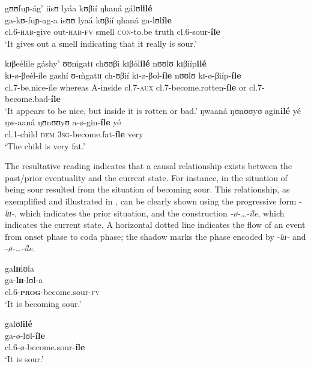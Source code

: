\documentclass[output=paper]{langscibook}
\begin{document}
\ea \label{ex:kanijo:15}
\ea \glll gʊʊfuɲ-ág’ iisʊ   lyáa kʊβií ŋhaná gálʊl\textbf{ilé}\\
    ga-kʊ-fuɲ-ag-a isʊʊ  lyaá kʊβií ŋhaná  ga-lʊl\textbf{íle}\\
    cl.6-\textsc{hab}-give out-\textsc{hab}-\textsc{fv} smell \textsc{con}-to.be truth   cl.6-sour-\textbf{íle}\\
    \glt ‘It gives out a smell indicating that it really is sour.’

\ex 
    \glll   kɪβeélile       gáshy’      ʊʊḿgatɪ         chʊʊβi      kɪβól\textbf{ilé}  nʊʊlʊ kɪβííp\textbf{ilé}\\ 
            kɪ-ø-βeél-íle    gashí      ʊ-\`{m}gatɪɪ    ch-ʊβií     kɪ-ø-βol-\textbf{íle} nʊʊlʊ kɪ-ø-βiíp-\textbf{íle}\\       
            cl.7-be.nice-íle  whereas   A-inside        cl.7-\textsc{aux}    cl.7-become.rotten-\textbf{íle} or     cl.7-become.bad-\textbf{íle}\\
    \glt ‘It appears to be nice, but inside it is rotten or bad.’
\ex 
    \glll   ŋwaaná   ŋʊnʊʊyʊ    agin\textbf{ilé}  yé\\
            ŋw-aaná   ŋʊnʊʊyʊ   a-ø-gin-\textbf{íle}    yé\\
            cl.1-child \textsc{dem}         3\textsc{sg}-become.fat-\textbf{íle} very\\
    \glt ‘The child is very fat.’
\z
\z

The resultative reading indicates that a causal relationship exists between the past/prior eventuality and the current state. For instance, in  the situation of being sour resulted from the situation of becoming sour. This relationship, as exemplified and illustrated in , can be clearly shown using the progressive form -\textit{lɪɪ}\textit{-}, which indicates the prior situation, and the construction \textit{-ø}\textit{-\ldots-íle}, which indicates the current state. A horizontal dotted line indicates the flow of an event from onset phase to coda phase; the shadow marks the phase encoded by -\textit{lɪɪ}\textit{-} and \textit{-ø}\textit{-\ldots-íle}. 

\ea \label{ex:kanijo:16}
    \ea 
    \glll ga\textbf{lɪɪ}lʊla\\
    ga-\textbf{lɪɪ}-lʊl-a\\
    cl.6-\textbf{\textsc{prog}}-become.sour-\textsc{fv}\\
    \glt ‘It is becoming sour.’
    
    \ex 
    \glll galʊl\textbf{ilé}\\
    ga-ø-lʊl-\textbf{íle}\\
    cl.6-ø-become.sour-\textbf{íle}\\
    \glt ‘It is sour.’
    
\end{document}

